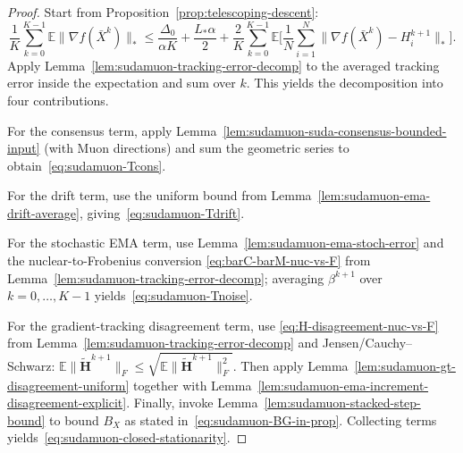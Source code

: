 \documentclass{article}
\begin{document}
\begin{proof}
Start from Proposition~\ref{prop:telescoping-descent}:
\[
\frac{1}{K}\sum_{k=0}^{K-1}\mathbb{E}\|\nabla f(\bar X^k)\|_*
\le \frac{\Delta_0}{\alpha K}+\frac{L_*\alpha}{2}
+\frac{2}{K}\sum_{k=0}^{K-1}\mathbb{E}\Big[\frac{1}{N}\sum_{i=1}^N\|\nabla f(\bar X^k)-H_i^{k+1}\|_*\Big].
\]
Apply Lemma~\ref{lem:sudamuon-tracking-error-decomp} to the averaged tracking error inside the expectation and sum over $k$.
This yields the decomposition into four contributions.

For the consensus term, apply Lemma~\ref{lem:sudamuon-suda-consensus-bounded-input} (with Muon directions) and sum the geometric series to obtain~\eqref{eq:sudamuon-Tcons}.

For the drift term, use the uniform bound from Lemma~\ref{lem:sudamuon-ema-drift-average}, giving~\eqref{eq:sudamuon-Tdrift}.

For the stochastic EMA term, use Lemma~\ref{lem:sudamuon-ema-stoch-error} and the nuclear-to-Frobenius conversion \eqref{eq:barC-barM-nuc-vs-F} from Lemma~\ref{lem:sudamuon-tracking-error-decomp}; averaging $\beta^{k+1}$ over $k=0,\dots,K-1$ yields~\eqref{eq:sudamuon-Tnoise}.

For the gradient-tracking disagreement term, use \eqref{eq:H-disagreement-nuc-vs-F} from Lemma~\ref{lem:sudamuon-tracking-error-decomp} and Jensen/Cauchy--Schwarz:
$\mathbb{E}\|\tilde{\mathbf H}^{k+1}\|_F\le \sqrt{\mathbb{E}\|\tilde{\mathbf H}^{k+1}\|_F^2}$.
Then apply Lemma~\ref{lem:sudamuon-gt-disagreement-uniform} together with Lemma~\ref{lem:sudamuon-ema-increment-disagreement-explicit}.
Finally, invoke Lemma~\ref{lem:sudamuon-stacked-step-bound} to bound $B_X$ as stated in~\eqref{eq:sudamuon-BG-in-prop}.
Collecting terms yields~\eqref{eq:sudamuon-closed-stationarity}.
\end{proof}
\end{document}

